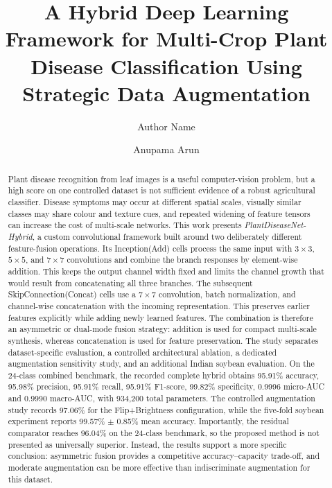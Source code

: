 \documentclass[a4paper,fleqn]{cas-dc}
\begin{document}
\let\WriteBookmarks\relax
{}
\title[mode=title]{A Hybrid Deep Learning Framework for Multi-Crop Plant Disease Classification Using Strategic Data Augmentation}
\author[1]{Author Name}
\author[1]{Anupama Arun}

\begin{abstract}
Plant disease recognition from leaf images is a useful computer-vision problem, but a high score on one controlled dataset is not sufficient evidence of a robust agricultural classifier. Disease symptoms may occur at different spatial scales, visually similar classes may share colour and texture cues, and repeated widening of feature tensors can increase the cost of multi-scale networks. This work presents \emph{PlantDiseaseNet-Hybrid}, a custom convolutional framework built around two deliberately different feature-fusion operations. Its Inception(Add) cells process the same input with $3\times3$, $5\times5$, and $7\times7$ convolutions and combine the branch responses by element-wise addition. This keeps the output channel width fixed and limits the channel growth that would result from concatenating all three branches. The subsequent SkipConnection(Concat) cells use a $7\times7$ convolution, batch normalization, and channel-wise concatenation with the incoming representation. This preserves earlier features explicitly while adding newly learned features. The combination is therefore an asymmetric or dual-mode fusion strategy: addition is used for compact multi-scale synthesis, whereas concatenation is used for feature preservation. The study separates dataset-specific evaluation, a controlled architectural ablation, a dedicated augmentation sensitivity study, and an additional Indian soybean evaluation. On the 24-class combined benchmark, the recorded complete hybrid obtains 95.91\% accuracy, 95.98\% precision, 95.91\% recall, 95.91\% F1-score, 99.82\% specificity, 0.9996 micro-AUC and 0.9990 macro-AUC, with 934,200 total parameters. The controlled augmentation study records 97.06\% for the Flip+Brightness configuration, while the five-fold soybean experiment reports 99.57\% $\pm$ 0.85\% mean accuracy. Importantly, the residual comparator reaches 96.04\% on the 24-class benchmark, so the proposed method is not presented as universally superior. Instead, the results support a more specific conclusion: asymmetric fusion provides a competitive accuracy--capacity trade-off, and moderate augmentation can be more effective than indiscriminate augmentation for this dataset.
\end{abstract}
\end{document}
